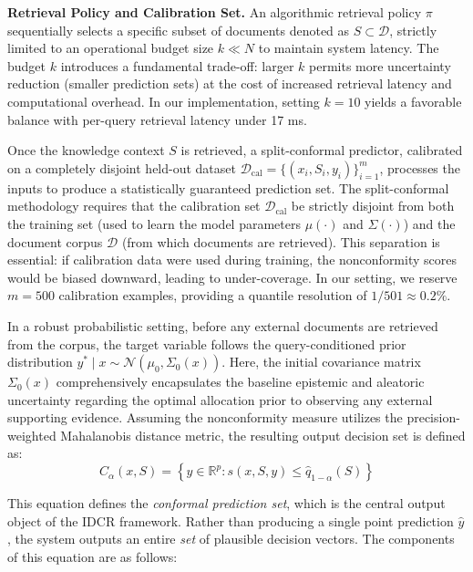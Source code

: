 \documentclass[12pt,a4paper,oneside]{report}
\theoremstyle{definition}
\theoremstyle{remark}
\begin{document}
\medskip
\noindent\textbf{Retrieval Policy and Calibration Set.}
An algorithmic retrieval policy $\pi$ sequentially selects a specific subset of documents denoted as $S \subset \mathcal{D}$, strictly limited to an operational budget size $k \ll N$ to maintain system latency. The budget $k$ introduces a fundamental trade-off: larger $k$ permits more uncertainty reduction (smaller prediction sets) at the cost of increased retrieval latency and computational overhead. In our implementation, setting $k = 10$ yields a favorable balance with per-query retrieval latency under 17 ms.

Once the knowledge context $S$ is retrieved, a split-conformal predictor, calibrated on a completely disjoint held-out dataset $\mathcal{D}_{\text{cal}} = \{(x_i, S_i, y_i)\}_{i=1}^m$, processes the inputs to produce a statistically guaranteed prediction set. The split-conformal methodology requires that the calibration set $\mathcal{D}_{\text{cal}}$ be strictly disjoint from both the training set (used to learn the model parameters $\mu(\cdot)$ and $\Sigma(\cdot)$) and the document corpus $\mathcal{D}$ (from which documents are retrieved). This separation is essential: if calibration data were used during training, the nonconformity scores would be biased downward, leading to under-coverage. In our setting, we reserve $m = 500$ calibration examples, providing a quantile resolution of $1/501 \approx 0.2\%$.

In a robust probabilistic setting, before any external documents are retrieved from the corpus, the target variable follows the query-conditioned prior distribution $y^* \mid x \sim \mathcal{N}(\mu_0, \Sigma_0(x))$. Here, the initial covariance matrix $\Sigma_0(x)$ comprehensively encapsulates the baseline epistemic and aleatoric uncertainty regarding the optimal allocation prior to observing any external supporting evidence. Assuming the nonconformity measure utilizes the precision-weighted Mahalanobis distance metric, the resulting output decision set is defined as:
\begin{equation} \label{eq:conformal_set}
C_{\alpha}(x, S) = \left\{ y \in \mathbb{R}^p : s(x, S, y) \leq \hat{q}_{1-\alpha}(S) \right\}
\end{equation}

\medskip
\noindent This equation defines the \emph{conformal prediction set}, which is the central output object of the IDCR framework. Rather than producing a single point prediction $\hat{y}$, the system outputs an entire \emph{set} of plausible decision vectors. The components of this equation are as follows:
\end{document}
